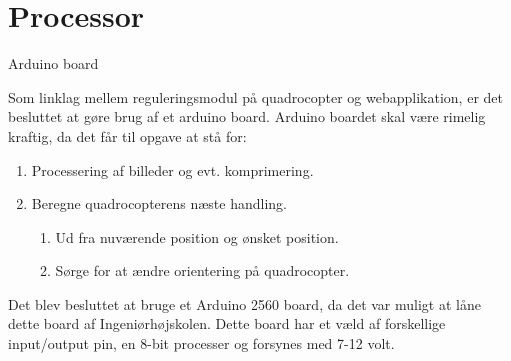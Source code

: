 \section{Processor}

Arduino board 

Som linklag mellem reguleringsmodul på quadrocopter og webapplikation, er det besluttet at gøre brug af et arduino board. Arduino boardet skal være rimelig kraftig, da det får til opgave at stå for:   
\begin{enumerate}[label*=\arabic*.]
	\item Processering af billeder og evt. komprimering.
	\item Beregne quadrocopterens næste handling. 
	
	\begin{enumerate}[label*=\arabic*.]
		\item Ud fra nuværende position og ønsket position.
		\item Sørge for at ændre orientering på quadrocopter. 
	\end{enumerate}
\end{enumerate}

\vspace{1cm}

Det blev besluttet at bruge et Arduino 2560 board, da det var muligt at låne dette board af Ingeniørhøjskolen. Dette board har et væld af forskellige input/output pin, en 8-bit processer og forsynes med 7-12 volt.

